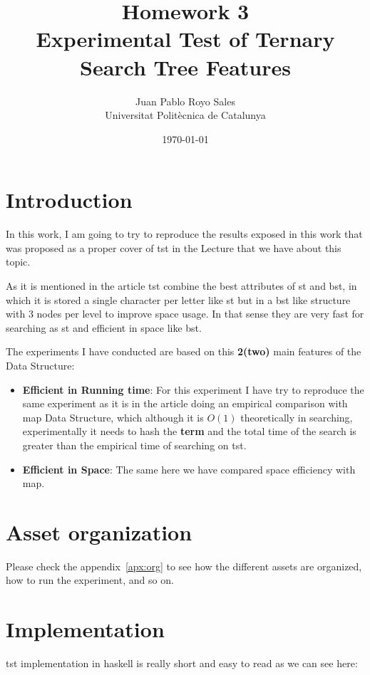 \documentclass[12pt, a4paper]{article}
\title{%
      Homework 3 \\
      Experimental Test of Ternary Search Tree Features
}
\author{%
  Juan Pablo Royo Sales \\
  \small{Universitat Politècnica de Catalunya}
}
\date\today
\begin{document}
\maketitle

\section{Introduction}\label{sec:intro}
In this work, I am going to try to reproduce the results exposed in this work \cite{cs_tst} that was proposed as a proper cover of \acrfull{tst} in the Lecture that we have about this topic.

As it is mentioned in the article \acrlong{tst} combine the best attributes of \acrfull{st} and \acrfull{bst}, in which it is stored a single character per letter like \acrshort{st} but in a \acrshort{bst} like structure with 3 nodes per level to improve space usage. In that sense they are very fast for searching as \acrshort{st} and efficient in space like \acrshort{bst}.

The experiments I have conducted are based on this \textbf{2(two)} main features of the Data Structure:

\begin{itemize}
  \item \textbf{Efficient in Running time}: For this experiment I have try to reproduce the same experiment as it is in the article doing an empirical comparison with \acrfull{map} Data Structure, which although it is $O(1)$ theoretically in searching, experimentally it needs to hash the \textbf{term} and the total time of the search is greater than the empirical time of searching on \acrshort{tst}.
  \item \textbf{Efficient in Space}: The same here we have compared space efficiency with \acrshort{map}.
\end{itemize}

\section{Asset organization}
Please check the appendix~\ref{apx:org} to see how the different assets are organized, how to run the experiment, and so on.

\section{Implementation}
\acrshort{tst} implementation in \acrfull{haskell} is really short and easy to read as we can see here:
\end{document}
